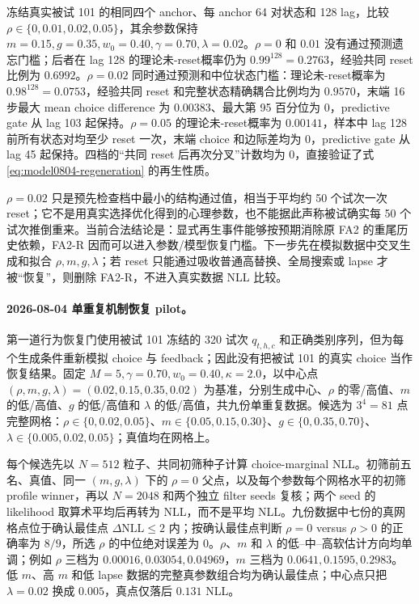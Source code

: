 冻结真实被试 101 的相同四个 anchor、每 anchor 64 对状态和 128 lag，比较 $\rho\in\{0,0.01,0.02,0.05\}$，其余参数保持 $m=0.15,g=0.35,w_0=0.40,\gamma=0.70,\lambda=0.02$。$\rho=0$ 和 $0.01$ 没有通过预测遗忘门槛；后者在 lag 128 的理论未-reset概率仍为 $0.99^{128}=0.2763$，经验共同 reset 比例为 $0.6992$。$\rho=0.02$ 同时通过预测和中位状态门槛：理论未-reset概率为 $0.98^{128}=0.0753$，经验共同 reset 和完整状态精确耦合比例均为 $0.9570$，末端 16 步最大 mean choice difference 为 $0.00383$、最大第 95 百分位为 0，predictive gate 从 lag 103 起保持。$\rho=0.05$ 的理论未-reset概率为 $0.00141$，样本中 lag 128 前所有状态对均至少 reset 一次，末端 choice 和边际差均为 0，predictive gate 从 lag 45 起保持。四档的“共同 reset 后再次分叉”计数均为 0，直接验证了式 \ref{eq:model0804-regeneration} 的再生性质。

$\rho=0.02$ 只是预先检查档中最小的结构通过值，相当于平均约 50 个试次一次 reset；它不是用真实选择优化得到的心理参数，也不能据此声称被试确实每 50 个试次推倒重来。当前合法结论是：显式再生事件能够按预期消除原 FA2 的重尾历史依赖，FA2-R 因而可以进入参数/模型恢复门槛。下一步先在模拟数据中交叉生成和拟合 $\rho,m,g,\lambda$；若 reset 只能通过吸收普通高替换、全局搜索或 lapse 才被“恢复”，则删除 FA2-R，不进入真实数据 NLL 比较。

\paragraph{2026-08-04 单重复机制恢复 pilot。}
第一道行为恢复门使用被试 101 冻结的 320 试次 $q_{t,h,c}$ 和正确类别序列，但为每个生成条件重新模拟 choice 与 feedback；因此没有把被试 101 的真实 choice 当作恢复结果。固定 $M=5,\gamma=0.70,w_0=0.40,\kappa=2.0$，以中心点 $(\rho,m,g,\lambda)=(0.02,0.15,0.35,0.02)$ 为基准，分别生成中心、$\rho$ 的零/高值、$m$ 的低/高值、$g$ 的低/高值和 $\lambda$ 的低/高值，共九份单重复数据。候选为 $3^4=81$ 点完整网格：$\rho\in\{0,0.02,0.05\}$、$m\in\{0.05,0.15,0.30\}$、$g\in\{0,0.35,0.70\}$、$\lambda\in\{0.005,0.02,0.05\}$；真值均在网格上。

每个候选先以 $N=512$ 粒子、共同初筛种子计算 choice-marginal NLL。初筛前五名、真值、同一 $(m,g,\lambda)$ 下的 $\rho=0$ 父点，以及每个参数每个网格水平的初筛 profile winner，再以 $N=2048$ 和两个独立 filter seeds 复核；两个 seed 的 likelihood 取算术平均后再转为 NLL，而不是平均 NLL。九份数据中七份的真网格点位于确认最佳点 $\Delta\mathrm{NLL}\leq2$ 内；按确认最佳点判断 $\rho=0$ versus $\rho>0$ 的正确率为 $8/9$，所选 $\rho$ 的中位绝对误差为 0。$\rho$、$m$ 和 $\lambda$ 的低--中--高软估计方向均单调；例如 $\rho$ 三档为 $0.00016,0.03054,0.04969$，$m$ 三档为 $0.0641,0.1595,0.2983$。低 $m$、高 $m$ 和低 lapse 数据的完整真参数组合均为确认最佳点；中心点只把 $\lambda=0.02$ 换成 $0.005$，真点仅落后 $0.131$ NLL。

